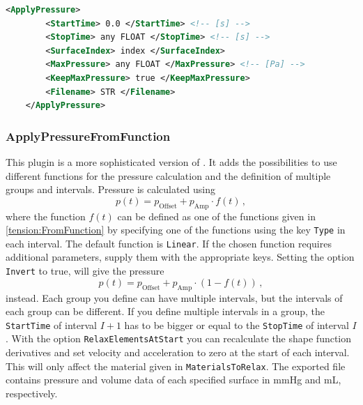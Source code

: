 \begin{lstlisting}[language=XML,caption=.xml settings for the ApplyPressure plugin]
    <ApplyPressure>
        <StartTime> 0.0 </StartTime> <!-- [s] -->
        <StopTime> any FLOAT </StopTime> <!-- [s] -->
        <SurfaceIndex> index </SurfaceIndex>
        <MaxPressure> any FLOAT </MaxPressure> <!-- [Pa] -->
        <KeepMaxPressure> true </KeepMaxPressure>
        <Filename> STR </Filename>
    </ApplyPressure>
\end{lstlisting}


\subsubsection{ApplyPressureFromFunction}
\label{plugin:ApplyPressureFromFunction}

This plugin is a more sophisticated version of .
It adds the possibilities to use different functions for the pressure calculation and the definition of multiple groups and intervals.
Pressure is calculated using
\begin{equation}
    p(t) = p_\mathrm{Offset} + p_\mathrm{Amp} \cdot f(t) \,,
\end{equation}
where the function $f(t)$ can be defined as one of the functions given in \autoref{tension:FromFunction} by specifying one of the functions using the key \verb|Type| in each interval.
The default function is \verb|Linear|.
If the chosen function requires additional parameters, supply them with the appropriate keys.
Setting the option \verb|Invert| to true, will give the pressure 
\begin{equation}
    p(t) = p_\mathrm{Offset} + p_\mathrm{Amp} \cdot (1 - f(t)) \,,
\end{equation}
instead.
Each group you define can have multiple intervals, but the intervals of each group can be different.
If you define multiple intervals in a group, the \verb|StartTime| of interval $I+1$ has to be bigger or equal to the \verb|StopTime| of interval $I$.
With the option \verb|RelaxElementsAtStart| you can recalculate the shape function derivatives and set velocity and acceleration to zero at the start of each interval.
This will only affect the material given in \verb|MaterialsToRelax|.
The exported file contains pressure and volume data of each specified surface in \si{mmHg} and \si{mL}, respectively.

